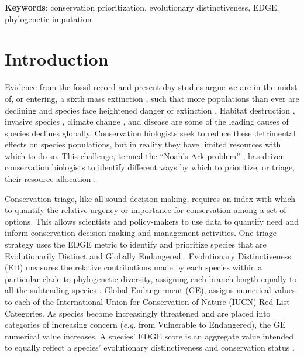 \documentclass[10pt,english]{article}
\begin{document}
\textbf{Keywords}: conservation prioritization, evolutionary distinctiveness, 
EDGE, phylogenetic imputation

\clearpage
\section*{Introduction}

Evidence from the fossil record and present-day studies argue we are in the
midst of, or entering, a sixth mass extinction \autocite{Barnosky2011,
Ceballos2015}, such that more populations than ever are declining and species
face heightened danger of extinction \autocite{Wake2008, Thomas2004}. Habitat
destruction \autocite{Brooks2002}, invasive species \autocite{Molnar2008},
climate change \autocite{Pounds2006}, and disease \autocite{Lips2006} are some
of the leading causes of species declines globally. Conservation biologists seek
to reduce these detrimental effects on species populations, but in reality they
have limited resources with which to do so. This challenge, termed the “Noah's
Ark problem” \autocite{Weitzman1998}, has driven conservation biologists to
identify different ways by which to prioritize, or triage, their resource
allocation \autocite{Bottrill2008}.

Conservation triage, like all sound decision-making, requires an index with
which to quantify the relative urgency or importance for conservation among a
set of options. This allows scientists and policy-makers to use data to quantify
need and inform conservation decision-making and management activities. One
triage strategy uses the EDGE metric to identify and prioritize species that are
Evolutionarily Distinct and Globally Endangered \autocite{Isaac2007}.
Evolutionary Distinctiveness (ED) measures the relative contributions made by
each species within a particular clade to phylogenetic diversity, assigning each
branch length equally to all the subtending species \autocite{Redding2003,
Isaac2007}. Global Endangerment (GE), assigns numerical values to each of the
International Union for Conservation of Nature (IUCN) Red List Categories. As
species become increasingly threatened and are placed into categories of
increasing concern (\emph{e.g.} from Vulnerable to Endangered), the GE numerical
value increases. A species’ EDGE score is an aggregate value intended to equally
reflect a species’ evolutionary distinctiveness and conservation status
\autocite[even if it does not always in practice; see][]{Pearse2015}.
\end{document}
